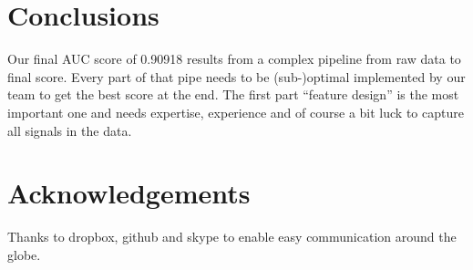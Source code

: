\section{Conclusions}
Our final AUC score of 0.90918 results from a complex pipeline from raw data to final score.
Every part of that pipe needs to be (sub-)optimal implemented by our team to get the best score at the end.
The first part ``feature design'' is the most important one and needs expertise, experience and of course a bit luck to capture all signals in the data.

\section{Acknowledgements}
Thanks to dropbox, github and skype to enable easy communication around the globe.
